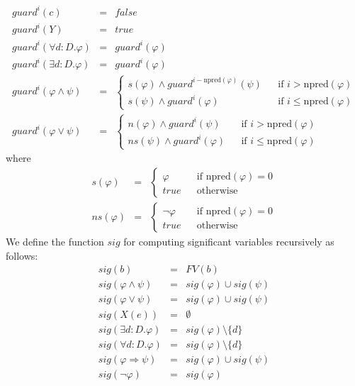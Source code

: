 \begin{equation*}
\begin{array}{lll}
guard^{i}(c) & = & false \\ 
guard^{i}(Y) & = & true \\ 
guard^{i}(\forall d:D.\varphi ) & = & guard^{i}(\varphi ) \\ 
guard^{i}(\exists d:D.\varphi ) & = & guard^{i}(\varphi ) \\ 
guard^{i}(\varphi \wedge \psi ) & = & \left\{ 
\begin{array}{lll}
s(\varphi )\wedge guard^{i-\mathrm{npred}(\varphi )}(\psi ) &  & \text{if }i>%
\mathrm{npred}(\varphi ) \\ 
s(\psi )\wedge guard^{i}(\varphi ) &  & \text{if }i\leq \mathrm{npred}%
(\varphi )%
\end{array}%
\right. \\ 
guard^{i}(\varphi \vee \psi ) & = & \left\{ 
\begin{array}{lll}
n(\varphi )\wedge guard^{i}(\psi ) &  & \text{if }i>\mathrm{npred}(\varphi )
\\ 
ns(\psi )\wedge guard^{i}(\varphi ) &  & \text{if }i\leq \mathrm{npred}%
(\varphi )%
\end{array}%
\right.%
\end{array}%
\end{equation*}%
where%
\begin{equation*}
\begin{array}{lll}
s(\varphi ) & = & \left\{ 
\begin{array}{lll}
\varphi &  & \text{if }\mathrm{npred}(\varphi )=0 \\ 
true &  & \text{otherwise}%
\end{array}%
\right. \\ 
ns(\varphi ) & = & \left\{ 
\begin{array}{lll}
\lnot \varphi &  & \text{if }\mathrm{npred}(\varphi )=0 \\ 
true &  & \text{otherwise}%
\end{array}%
\right.%
\end{array}%
\end{equation*}%
We define the function $sig$ for computing significant variables recursively
as follows:%
\begin{equation*}
\begin{array}{lll}
sig(b) & = & FV(b) \\ 
sig(\varphi \wedge \psi ) & = & sig(\varphi )\cup sig(\psi ) \\ 
sig(\varphi \vee \psi ) & = & sig(\varphi )\cup sig(\psi ) \\ 
sig(X(e)) & = & \emptyset \\ 
sig(\exists d:D.\varphi ) & = & sig(\varphi )\setminus \{d\} \\ 
sig(\forall d:D.\varphi ) & = & sig(\varphi )\setminus \{d\} \\ 
sig(\varphi \Rightarrow \psi ) & = & sig(\varphi )\cup sig(\psi ) \\ 
sig(\lnot \varphi ) & = & sig(\varphi )%
\end{array}%
\end{equation*}

